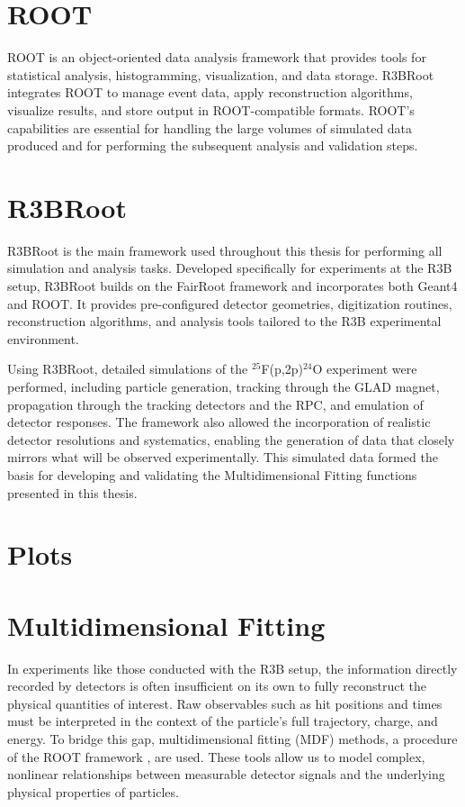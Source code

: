 \section{ROOT}

ROOT \cite{brun_root_1997} is an object-oriented data analysis framework that provides tools for statistical analysis, histogramming, visualization, and data storage. R3BRoot integrates ROOT to manage event data, apply reconstruction algorithms, visualize results, and store output in ROOT-compatible formats. ROOT’s capabilities are essential for handling the large volumes of simulated data produced and for performing the subsequent analysis and validation steps.


\section{R3BRoot}

R3BRoot \cite{bertini_r3broot_2011} is the main framework used throughout this thesis for performing all simulation and analysis tasks. Developed specifically for experiments at the \gls{R3B} setup, R3BRoot builds on the FairRoot framework \cite{al-turany_fairroot_2012} and incorporates both Geant4 and ROOT. It provides pre-configured detector geometries, digitization routines, reconstruction algorithms, and analysis tools tailored to the \gls{R3B} experimental environment.

Using R3BRoot, detailed simulations of the $^{25}$F(p,2p)$^{24}$O experiment were performed, including particle generation, tracking through the GLAD magnet, propagation through the tracking detectors and the \gls{RPC}, and emulation of detector responses. The framework also allowed the incorporation of realistic detector resolutions and systematics, enabling the generation of data that closely mirrors what will be observed experimentally. This simulated data formed the basis for developing and validating the Multidimensional Fitting functions presented in this thesis.

\section{Plots}

\section{Multidimensional Fitting}

In experiments like those conducted with the \gls{R3B} setup, the information directly recorded by detectors is often insufficient on its own to fully reconstruct the physical quantities of interest. Raw observables such as hit positions and times must be interpreted in the context of the particle’s full trajectory, charge, and energy. To bridge this gap, multidimensional fitting (MDF) methods, a procedure of the ROOT framework \cite{ROOTMDF}, are used. These tools allow us to model complex, nonlinear relationships between measurable detector signals and the underlying physical properties of particles.

